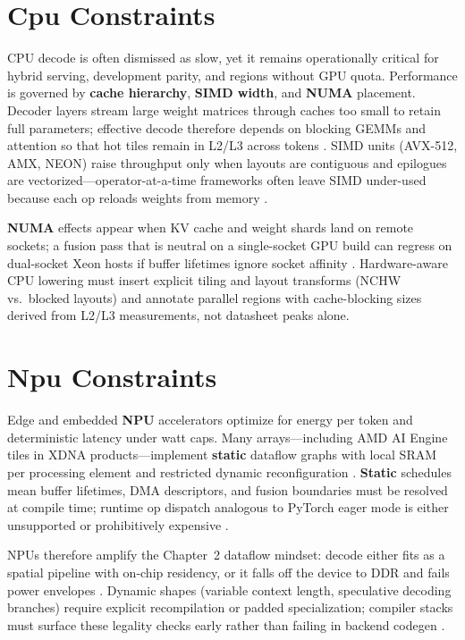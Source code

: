 \section{Cpu Constraints}
\label{sec:cpu_constraints}

CPU decode is often dismissed as slow, yet it remains operationally critical for hybrid serving, development parity, and regions without GPU quota.
Performance is governed by \textbf{cache hierarchy}, \textbf{SIMD width}, and \textbf{NUMA} placement.
Decoder layers stream large weight matrices through caches too small to retain full parameters; effective decode therefore depends on blocking GEMMs and attention so that hot tiles remain in L2/L3 across tokens \citep{dlbook,patel2025llminference}.
SIMD units (AVX-512, AMX, NEON) raise throughput only when layouts are contiguous and epilogues are vectorized---operator-at-a-time frameworks often leave SIMD under-used because each op reloads weights from memory \citep{memoryfloor2026}.

\textbf{NUMA} effects appear when KV cache and weight shards land on remote sockets; a fusion pass that is neutral on a single-socket GPU build can regress on dual-socket Xeon hosts if buffer lifetimes ignore socket affinity \citep{patel2025llminference}.
Hardware-aware CPU lowering must insert explicit tiling and layout transforms (NCHW vs.\ blocked layouts) and annotate parallel regions with cache-blocking sizes derived from L2/L3 measurements, not datasheet peaks alone.

\section{Npu Constraints}
\label{sec:npu_constraints}

Edge and embedded \textbf{NPU} accelerators optimize for energy per token and deterministic latency under watt caps.
Many arrays---including AMD AI Engine tiles in XDNA products---implement \textbf{static} dataflow graphs with local SRAM per processing element and restricted dynamic reconfiguration \citep{amd2024aie,amd2024xdna}.
\textbf{Static} schedules mean buffer lifetimes, DMA descriptors, and fusion boundaries must be resolved at compile time; runtime op dispatch analogous to PyTorch eager mode is either unsupported or prohibitively expensive \citep{amd2024xdna}.

NPUs therefore amplify the Chapter~2 dataflow mindset: decode either fits as a spatial pipeline with on-chip residency, or it falls off the device to DDR and fails power envelopes \citep{patel2025llminference}.
Dynamic shapes (variable context length, speculative decoding branches) require explicit recompilation or padded specialization; compiler stacks must surface these legality checks early rather than failing in backend codegen \citep{amd2024xdna,memoryfloor2026}.

